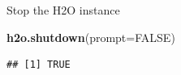 \documentclass[]{book}
\newenvironment{Shaded}{\begin{snugshade}}{\end{snugshade}}
\newcommand{\KeywordTok}[1]{\textcolor[rgb]{0.13,0.29,0.53}{\textbf{#1}}}
\newcommand{\DataTypeTok}[1]{\textcolor[rgb]{0.13,0.29,0.53}{#1}}
\newcommand{\OtherTok}[1]{\textcolor[rgb]{0.56,0.35,0.01}{#1}}
\newcommand{\NormalTok}[1]{#1}
\begin{document}
Stop the H2O instance

\begin{Shaded}
\begin{Highlighting}[]
\KeywordTok{h2o.shutdown}\NormalTok{(}\DataTypeTok{prompt=}\OtherTok{FALSE}\NormalTok{)}
\end{Highlighting}
\end{Shaded}

\begin{verbatim}
## [1] TRUE
\end{verbatim}


\end{document}
